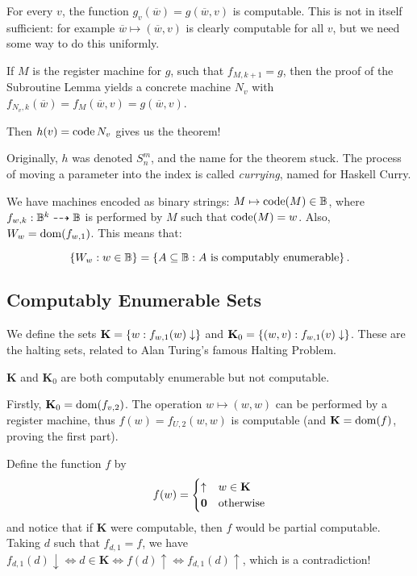 \documentclass{article}
\begin{document}
\begin{prf}
	For every $v$, the function $g_v(\overline w) = g(\overline w, v)$ is computable. This is not in itself sufficient: for example $\overline w \mapsto (\overline w, v)$ is clearly computable for all $v$, but we need some way to do this uniformly.
	    
	If $M$ is the register machine for $g$, such that $f_{M,k+1} = g$, then the proof of the Subroutine Lemma yields a concrete machine $N_v$ with $f_{N_v, k} (\overline w) = f_M (\overline w, v) = g(\overline w, v)$.
	    
	Then $h(v) = \operatorname{code} N_v$ gives us the theorem!
\end{prf}

\begin{note}
	Originally, $h$ was denoted $S^m_n$, and the name for the theorem stuck. The process of moving a parameter into the index is called \textit{currying}, named for Haskell Curry.
\end{note}

\begin{corollary}
	We have machines encoded as binary strings: $M \mapsto \operatorname{code}(M) \in \mathbb{B}$, where $f_{w, k}: \mathbb{B}^k \dashrightarrow \mathbb{B}$ is performed by $M$ such that $\operatorname{code}(M) = w$. Also, $W_w = \operatorname{dom}(f_{w, 1})$. This means that:
\end{corollary}
\[
	\left\lbrace W_w : w \in \mathbb{B} \right\rbrace = \left\lbrace A \subseteq \mathbb{B} : A \text{ is computably enumerable} \right\rbrace.
\]


\subsection{Computably Enumerable Sets}

We define the sets
$\mathbf{K} = \left\lbrace w : f_{w, 1}(w) \downarrow \right\rbrace$ and
$\mathbf{K}_0 = \left\lbrace (w, v) : f_{w, 1}(v) \downarrow \right\rbrace$.
These are the halting sets, related to Alan Turing's famous Halting Problem.

\begin{theorem}
	$\mathbf{K}$ and $\mathbf{K}_0$ are both computably enumerable but not computable.
\end{theorem}

\begin{prf}
	Firstly, $\mathbf{K}_0 = \operatorname{dom}(f_{v, 2})$. The operation $w \mapsto (w, w)$ can be performed by a register machine, thus $f(w) = f_{U, 2}(w, w)$ is computable (and $\mathbf{K} = \operatorname{dom}(f)$, proving the first part).
	    
	Define the function $f$ by
	\[
		f(w) =
		\begin{cases}
			\uparrow   & w \in \mathbf{K} \\
			\textbf{0} & \!\mathrel{\, \text{otherwise}}     
		\end{cases}
	\]
	and notice that if $\mathbf{K}$ were computable, then $f$ would be partial computable. Taking $d$ such that $f_{d,1} = f$, we have $f_{d,1}(d)\downarrow \iff d \in \mathbf{K} \iff f(d)\uparrow \iff f_{d,1}(d)\uparrow$, which is a contradiction!
\end{prf}
\end{document}
